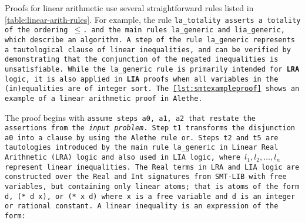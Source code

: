 Proofs for linear arithmetic use several straightforward rules listed in \cref{table:linear-arith-rules}.
For example, the rule \tt{la\_totality} asserts a totality of the ordering $\leq$.
and the main rules \tt{la\_generic} and \tt{lia\_generic}, which describe an algorithm.
A step of the rule \tt{la\_generic} represents a tautological clause of linear inequalities, and can be verified by demonstrating that the conjunction of the negated inequalities is unsatisfiable.
While the \tt{la\_generic rule} is primarily intended for \textbf{LRA} logic, it is also applied in \textbf{LIA} proofs when all variables in the (in)equalities are of integer sort.
The \cref{lst:smtexampleproof} shows an example of a linear arithmetic proof in Alethe.





The proof begins with \tt{assume} steps \tt{a0}, \tt{a1}, \tt{a2} that restate the assertions from the \emph{input problem}. %
Step \tt{t1} transforms the disjunction \texttt{a0} into a clause by using the Alethe rule \tt{or}.
Steps \tt{t2} and \tt{t5} are tautologies introduced by the main rule \tt{la\_generic}
in Linear Real Arithmetic (LRA) logic and also used in LIA logic, where \colorbox{green!30}{$l_1, l_2,\dots, l_n$} represent linear inequalities.
The \lstinline[language=SMT,basicstyle=\ttfamily\footnotesize]{Real} terms in LRA and LIA logic are constructed over the \lstinline[language=SMT,basicstyle=\ttfamily\footnotesize]{Real} and \lstinline[language=SMT,basicstyle=\ttfamily\footnotesize]{Int} signatures from SMT-LIB with free variables, but containing only linear atoms; that is
atoms of the form \lstinline[language=SMT,basicstyle=\ttfamily\footnotesize]{d}, \lstinline[language=SMT,basicstyle=\ttfamily\footnotesize]{(* d x)}, or \lstinline[language=SMT,basicstyle=\ttfamily\footnotesize]{(* x d)}  where \lstinline[language=SMT,basicstyle=\ttfamily\footnotesize]{x} is a free variable and  \lstinline[language=SMT,basicstyle=\ttfamily\footnotesize]{d} is an integer or rational constant.
A linear inequality is an expression of the form:

